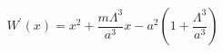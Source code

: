 \begin{equation}\label{W42}
W^{\prime}(x)=x^2+\frac{m\Lambda^3}{a^3}x-a^2(1+\frac{\Lambda^3}{a^3})
\end{equation}

